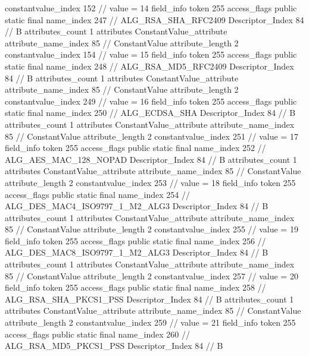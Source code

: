 {{{{{{{					constantvalue_index	152		// value = 14
				}
				}
			}
			field_info {
				token	255
				access_flags	public static final
				name_index	247		// ALG_RSA_SHA_RFC2409
				Descriptor_Index	84		// B
				attributes_count	1
				attributes {
				ConstantValue_attribute {
					attribute_name_index	85		// ConstantValue
					attribute_length	2
					constantvalue_index	154		// value = 15
				}
				}
			}
			field_info {
				token	255
				access_flags	public static final
				name_index	248		// ALG_RSA_MD5_RFC2409
				Descriptor_Index	84		// B
				attributes_count	1
				attributes {
				ConstantValue_attribute {
					attribute_name_index	85		// ConstantValue
					attribute_length	2
					constantvalue_index	249		// value = 16
				}
				}
			}
			field_info {
				token	255
				access_flags	public static final
				name_index	250		// ALG_ECDSA_SHA
				Descriptor_Index	84		// B
				attributes_count	1
				attributes {
				ConstantValue_attribute {
					attribute_name_index	85		// ConstantValue
					attribute_length	2
					constantvalue_index	251		// value = 17
				}
				}
			}
			field_info {
				token	255
				access_flags	public static final
				name_index	252		// ALG_AES_MAC_128_NOPAD
				Descriptor_Index	84		// B
				attributes_count	1
				attributes {
				ConstantValue_attribute {
					attribute_name_index	85		// ConstantValue
					attribute_length	2
					constantvalue_index	253		// value = 18
				}
				}
			}
			field_info {
				token	255
				access_flags	public static final
				name_index	254		// ALG_DES_MAC4_ISO9797_1_M2_ALG3
				Descriptor_Index	84		// B
				attributes_count	1
				attributes {
				ConstantValue_attribute {
					attribute_name_index	85		// ConstantValue
					attribute_length	2
					constantvalue_index	255		// value = 19
				}
				}
			}
			field_info {
				token	255
				access_flags	public static final
				name_index	256		// ALG_DES_MAC8_ISO9797_1_M2_ALG3
				Descriptor_Index	84		// B
				attributes_count	1
				attributes {
				ConstantValue_attribute {
					attribute_name_index	85		// ConstantValue
					attribute_length	2
					constantvalue_index	257		// value = 20
				}
				}
			}
			field_info {
				token	255
				access_flags	public static final
				name_index	258		// ALG_RSA_SHA_PKCS1_PSS
				Descriptor_Index	84		// B
				attributes_count	1
				attributes {
				ConstantValue_attribute {
					attribute_name_index	85		// ConstantValue
					attribute_length	2
					constantvalue_index	259		// value = 21
				}
				}
			}
			field_info {
				token	255
				access_flags	public static final
				name_index	260		// ALG_RSA_MD5_PKCS1_PSS
				Descriptor_Index	84		// B
}}}}}
